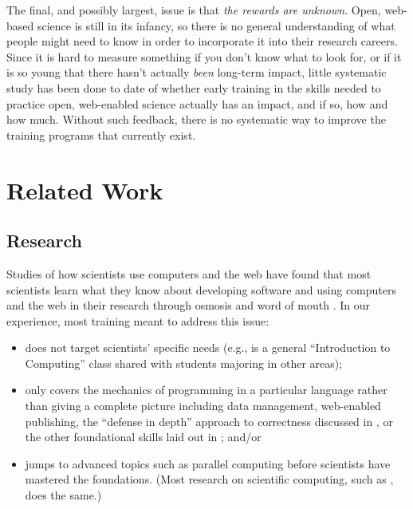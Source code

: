 \documentclass[11pt]{article}
\begin{document}
The final, and possibly largest, issue is that \emph{the rewards are
  unknown}.  Open, web-based science is still in its infancy, so there
is no general understanding of what people might need to know in order
to incorporate it into their research careers.  Since it is hard to
measure something if you don't know what to look for, or if it is so
young that there hasn't actually \emph{been} long-term impact, little
systematic study has been done to date of whether early training in
the skills needed to practice open, web-enabled science actually has
an impact, and if so, how and how much.  Without such feedback, there
is no systematic way to improve the training programs that currently
exist.

\section{Related Work}

\subsection{Research}

Studies of how scientists use computers and the web have found that
most scientists learn what they know about developing software and
using computers and the web in their research through osmosis and word
of mouth \cite{hannay2009,prabhu2011}. In our experience, most
training meant to address this issue:

\begin{itemize}

\item
  does not target scientists' specific needs (e.g., is a general
  ``Introduction to Computing'' class shared with students majoring in
  other areas);

\item
  only covers the mechanics of programming in a particular language
  rather than giving a complete picture including data management,
  web-enabled publishing, the ``defense in depth'' approach to
  correctness discussed in \cite{dubois2005}, or the other
  foundational skills laid out in \cite{wilson2013}; and/or

\item
  jumps to advanced topics such as parallel computing before
  scientists have mastered the foundations.  (Most research on
  scientific computing, such as \cite{hochstein2005}, does the same.)

\end{itemize}
\end{document}
